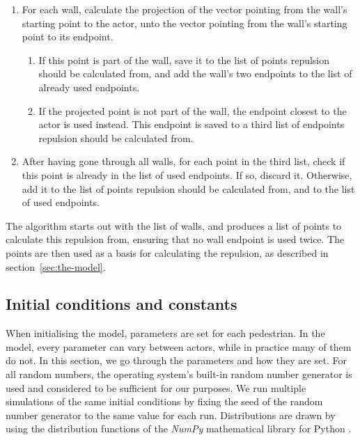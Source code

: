 \begin{enumerate}
    \item For each wall, calculate the projection of the vector pointing from 
        the wall's starting point to the actor, unto the vector pointing from 
        the wall's starting point to its endpoint.
        \begin{enumerate}
            \item If this point is part of the wall, save it to the list of points 
                repulsion should be calculated from, and add the wall's two endpoints 
                to the list of already used endpoints.

            \item If the projected point is not part of the wall, the endpoint closest 
                to the actor is used instead. This endpoint is saved to a 
                third list of endpoints repulsion should be calculated from.
        \end{enumerate}

    \item After having gone through all walls, for each point in the third 
        list, check if this point is already in the list of used endpoints. If 
        so, discard it. Otherwise, add it to the list of points repulsion 
        should be calculated from, and to the list of used endpoints.
\end{enumerate}

The algorithm starts out with the list of walls, and produces a list of points 
to calculate this repulsion from, ensuring that no wall endpoint is used 
twice. The points are then used as a basis for calculating the repulsion, as 
described in section~\ref{sec:the-model}.

\subsection{Initial conditions and constants}
When initialising the model, parameters are set for each pedestrian. In the 
model, every parameter can vary between actors, while in practice many of them 
do not. In this section, we go through the parameters and how they are set.  
For all random numbers, the operating system's built-in random number 
generator is used and considered to be sufficient for our purposes. We run 
multiple simulations of the same initial conditions by fixing the seed of the 
random number generator to the same value for each run. Distributions are 
drawn by using the distribution functions of the \emph{NumPy} mathematical 
library for Python \cite{numpy}.

